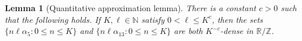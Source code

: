 \documentclass[11pt]{amsart}
\newtheorem{lemma}{Lemma}[section]
\theoremstyle{definition}
\begin{document}

\begin{lemma}[Quantitative approximation lemma]\label{lem:quantitativeapproximation}
There is a constant $c > 0$ such that the following holds.  If $K,\ell \in \mathbb{N}$ satisfy $0 < \ell \le K^c$, then the sets $\{n\ell \alpha_5: 0 \leq n \leq K\}$ and $\{n\ell \alpha_{13}: 0 \leq n \leq K\}$ are both $K^{-c}$-dense in $\mathbb{R}/\mathbb{Z}$.
\end{lemma}
\end{document}
